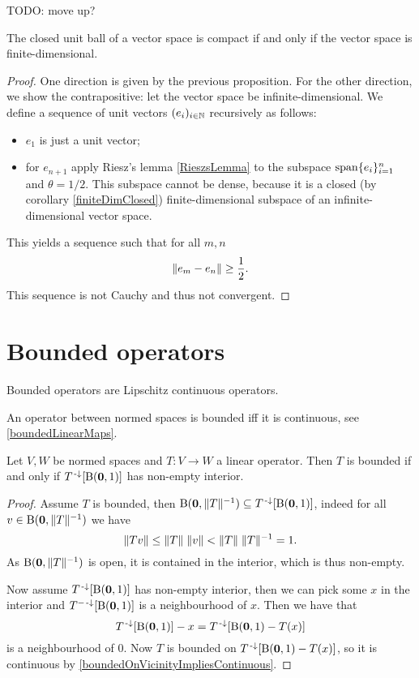 TODO: move up?
\begin{proposition} \label{compactnessUnitBall}
The closed unit ball of a vector space is compact \textup{if and only if} the vector space is finite-dimensional.
\end{proposition}
\begin{proof}
One direction is given by the previous proposition. For the other direction, we show the contrapositive: let the vector space be infinite-dimensional.
We define a sequence of unit vectors $(e_i)_{i\in\mathbb{N}}$ recursively as follows:
\begin{itemize}
\item $e_1$ is just a unit vector;
\item for $e_{n+1}$ apply Riesz's lemma \ref{RieszsLemma} to the subspace $\operatorname{span}\{e_i\}_{i=1}^n$ and $\theta = 1/2$. This subspace cannot be dense, because it is a closed (by corollary \ref{finiteDimClosed}) finite-dimensional subspace of an infinite-dimensional vector space.
\end{itemize}
This yields a sequence such that for all $m,n$
\[ \lVert e_m - e_n\rVert\geq \frac{1}{2}. \]
This sequence is not Cauchy and thus not convergent.
\end{proof}





\section{Bounded operators}
Bounded operators are Lipschitz continuous operators.

An operator between normed spaces is bounded iff it is continuous, see \ref{boundedLinearMaps}.

\begin{lemma}
Let $V,W$ be normed spaces and $T:V\to W$ a linear operator. Then $T$ is bounded \textup{if and only if} $T^{{\text{\hspace{0.15em}-}\downarrow}}[\operatorname{B}(\boldsymbol{\mathrm{0}},1)]$ has non-empty interior.
\end{lemma}
\begin{proof}
Assume $T$ is bounded, then $\operatorname{B}(\boldsymbol{\mathrm{0}}, \lVert T\rVert^{-1}) \subseteq T^{{\text{\hspace{0.15em}-}\downarrow}}[\operatorname{B}(\boldsymbol{\mathrm{0}},1)]$, indeed for all $v\in \operatorname{B}(\boldsymbol{\mathrm{0}}, \lVert T\rVert^{-1})$ we have
\[ \lVert Tv\rVert \leq \lVert T\rVert\;\lVert v\rVert < \lVert T\rVert\;\lVert T\rVert^{-1} = 1.  \]
As $\operatorname{B}(\boldsymbol{\mathrm{0}}, \lVert T\rVert^{-1})$ is open, it is contained in the interior, which is thus non-empty.

Now assume $T^{{\text{\hspace{0.15em}-}\downarrow}}[\operatorname{B}(\boldsymbol{\mathrm{0}},1)]$ has non-empty interior, then we can pick some $x$ in the interior and $T^{-{\text{\hspace{0.15em}-}\downarrow}}[\operatorname{B}(\boldsymbol{\mathrm{0}},1)]$ is a neighbourhood of $x$. Then we have that
\[ T^{{\text{\hspace{0.15em}-}\downarrow}}[\operatorname{B}(\boldsymbol{\mathrm{0}},1)] - x = T^{{\text{\hspace{0.15em}-}\downarrow}}[\operatorname{B}(\boldsymbol{\mathrm{0}},1)- T(x)] \]
is a neighbourhood of $0$. Now $T$ is bounded on $T^{{\text{\hspace{0.15em}-}\downarrow}}[\operatorname{B}(\boldsymbol{\mathrm{0}},1)- T(x)]$, so it is continuous by \ref{boundedOnVicinityImpliesContinuous}.
\end{proof}

